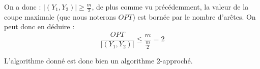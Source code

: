 On a donc : $|(Y_1,Y_2)| \geq \frac{m}{2}$, de plus comme vu précédemment, la valeur de la coupe
maximale (que nous noterons $OPT$) est bornée par le nombre d'arêtes. On peut donc en déduire : $$
\frac{OPT}{|(Y_1,Y_2)|} \leq \frac{m}{\frac{m}{2}} = 2 $$

L'algorithme donné est donc bien un algorithme 2-approché.

%		
%


